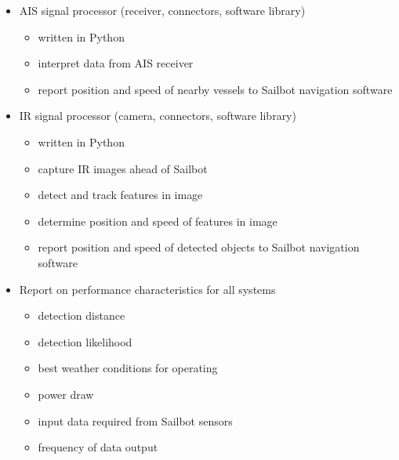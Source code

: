 \begin{itemize}
\item AIS signal processor (receiver, connectors, software library)
\begin{itemize}
\item written in Python
\item interpret data from AIS receiver
\item report position and speed of nearby vessels to Sailbot navigation software
\end{itemize}

\item IR signal processor (camera, connectors, software library)
\begin{itemize}
\item written in Python
\item capture IR images ahead of Sailbot
\item detect and track features in image
\item determine position and speed of features in image
\item report position and speed of detected objects to Sailbot navigation software
\end{itemize}

\item Report on performance characteristics for all systems
\begin{itemize}
\item detection distance
\item detection likelihood
\item best weather conditions for operating
\item power draw
\item input data required from Sailbot sensors
\item frequency of data output
\end{itemize}
\end{itemize}